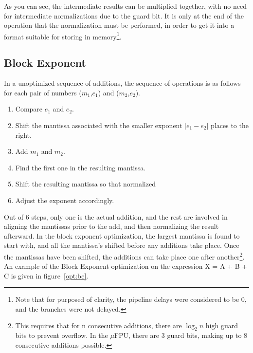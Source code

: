 As you can see, the intermediate results can be multiplied together, with no
need for intermediate normalizations due to the guard bit.  It is only at
the end of the operation that the normalization must be performed, in order
to get it into a format suitable for storing in memory\footnote{Note that
for purposed of clarity, the pipeline delays were considered to be 0, and
the branches were not delayed.}.

\subsection{Block Exponent}

In a unoptimized sequence of additions, the sequence of operations is as
follows for each pair of numbers ($m_1$,$e_1$) and ($m_2$,$e_2$).
\begin{enumerate}
  \item Compare $e_1$ and $e_2$.
  \item Shift the mantissa associated with the smaller exponent $|e_1-e_2|$
        places to the right.
  \item Add $m_1$ and $m_2$.
  \item Find the first one in the resulting mantissa.
  \item Shift the resulting mantissa so that normalized
  \item Adjust the exponent accordingly.
\end{enumerate}

Out of 6 steps, only one is the actual addition, and the rest are involved
in aligning the mantissas prior to the add, and then normalizing the result
afterward.  In the block exponent optimization, the largest mantissa is
found to start with, and all the mantissa's shifted before any additions
take place.  Once the mantissas have been shifted, the additions can take
place one after another\footnote{This requires that for n consecutive
additions, there are $\log_{2}n$ high guard bits to prevent overflow.  In
the $\mu$FPU, there are 3 guard bits, making up to 8 consecutive additions
possible.}.  An example of the Block Exponent optimization on the expression
X = A + B + C is given in figure~\ref{opt:be}.

%

